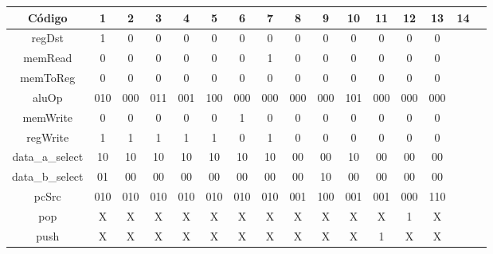 	\begin{center}
		\begin{longtable}[pos]{| c | c | c | c | c | c | c | c | c | c | c | c | c | c | c | c |} \hline
			\multicolumn{1}{|c|}{\cellcolor[gray]{0.9}\textbf{\small Código}} & 
			\multicolumn{1}{c|}{\cellcolor[gray]{0.9}\textbf{1}} & 
			\multicolumn{1}{c|}{\cellcolor[gray]{0.9}\textbf{2}} &
			\multicolumn{1}{c|}{\cellcolor[gray]{0.9}\textbf{3}} &
            \multicolumn{1}{c|}{\cellcolor[gray]{0.9}\textbf{4}} &
            \multicolumn{1}{c|}{\cellcolor[gray]{0.9}\textbf{5}} &
            \multicolumn{1}{c|}{\cellcolor[gray]{0.9}\textbf{6}} &
            \multicolumn{1}{c|}{\cellcolor[gray]{0.9}\textbf{7}} &
            \multicolumn{1}{c|}{\cellcolor[gray]{0.9}\textbf{8}} &
            \multicolumn{1}{c|}{\cellcolor[gray]{0.9}\textbf{9}} &
            \multicolumn{1}{c|}{\cellcolor[gray]{0.9}\textbf{10}} &
			\multicolumn{1}{c|}{\cellcolor[gray]{0.9}\textbf{11}} &
			\multicolumn{1}{c|}{\cellcolor[gray]{0.9}\textbf{12}} &
            \multicolumn{1}{c|}{\cellcolor[gray]{0.9}\textbf{13}} &
            \multicolumn{1}{c|}{\cellcolor[gray]{0.9}\textbf{14}} \\ \hline
			\endhead
			\hline
			\endlastfoot
			
			\small regDst 			& 1   & 0   & 0   & 0   & 0   & 0   & 0   & 0   & 0   & 0   & 0   & 0   & 0  &  \\ \hline
            \small memRead 			& 0   & 0   & 0   & 0   & 0   & 0   & 1   & 0   & 0   & 0   & 0   & 0   & 0  &  \\ \hline
            \small memToReg 		& 0   & 0   & 0   & 0   & 0   & 0   & 0   & 0   & 0   & 0   & 0   & 0   & 0  &  \\ \hline
            \small aluOp 			& \small 010 & \small 000 & \small 011 & \small 001 & \small 100 & \small 000 & \small 000 & \small 000 & \small 000 & \small 101 & \small 000 & \small 000 & \small 000 & \\ \hline
            \small memWrite 		& 0   & 0   & 0   & 0   & 0   & 1   & 0   & 0   & 0   & 0   & 0   & 0   & 0  &  \\ \hline
            \small regWrite 		& 1   & 1   & 1   & 1   & 1   & 0   & 1   & 0   & 0   & 0   & 0   & 0   & 0  &  \\ \hline
            \small data\_a\_select 		& 10  & 10  & 10  & 10  & 10  & 10  & 10  & 00  & 00  & 10  & 00  & 00  & 00 & \\ \hline
            \small data\_b\_select 		& 01  & 00  & 00  & 00  & 00  & 00  & 00  & 00  & 10  & 00  & 00  & 00  & 00 & \\ \hline
            \small pcSrc 			& \small 010 & \small 010   & \small 010 & \small 010 & \small 010 & \small 010 & \small 010 & \small 001 & \small 100 & \small 001 & \small 001 & \small 000 & \small 110 & \\ \hline
            \small pop 				& X   & X   & X   & X   & X   & X   & X   & X   & X   & X   & X   & 1   & X  &  \\ \hline
            \small push 			& X   & X   & X   & X   & X   & X   & X   & X   & X   & X   & 1   & X   & X  &  \\ \hline


\end{longtable}
\end{center}

